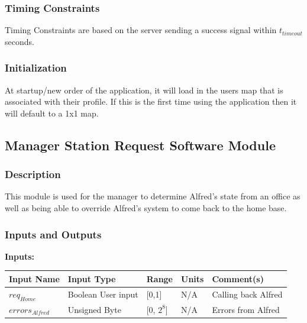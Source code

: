 \documentclass [10pt]{article}
\begin{document}
\subsubsection{Timing Constraints}
Timing Constraints are based on the server sending a success signal within  $ t_{timeout} $ seconds.


\subsubsection{Initialization}
At startup/new order of the application, it will load in the users map that is associated with their profile. If this is the first time using the application then it will default to a 1x1 map.


\subsection{Manager Station Request Software Module}


\subsubsection{Description}
This module is used for the manager to determine Alfred's state from an office as well as being able to override Alfred's system to come back to the home base. 


\subsubsection{Inputs and Outputs}

\textbf{Inputs: } \\

\begin{longtable}{|l|l|l|l|l|}\hline 
	\rowcolor{tableCell}\textbf{Input Name} & \textbf{Input Type} & \textbf{Range} & \textbf{Units} & \textbf{Comment(s)} \\ \hline
	$ req_{Home} $ & Boolean User input &  [0,1] & N/A & Calling back Alfred \\ \hline
	\rowcolor{tableCell}$  errors_{Alfred} $ & Unsigned Byte & [0, $2^{8}$]& N/A & Errors from Alfred \\ \hline
\end{longtable}
\end{document}
